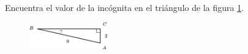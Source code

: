 Encuentra el valor de la incógnita en el triángulo de la figura \ref{fig:angle_functrig_09}.
\begin{figure}[H]
    \begin{center}
        \includegraphics[width=0.3\textwidth]{../images/angle_functrig_09.png}
    \end{center}
    \caption{}
    \label{fig:angle_functrig_09}
\end{figure}